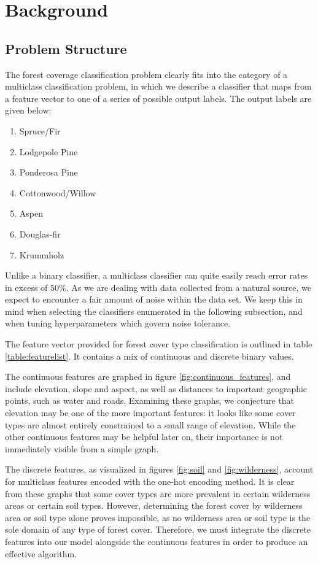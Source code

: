 \section{Background}
\label{sec:-back}
\subsection{Problem Structure}
The forest coverage classification problem clearly fits into the 
category of a multiclass classification problem, in which we describe 
a classifier that maps from a feature vector to one of a series of 
possible output labels. The output labels are given below:

\begin{enumerate}
\item Spruce/Fir
\item Lodgepole Pine
\item Ponderosa Pine
\item Cottonwood/Willow
\item Aspen
\item Douglas-fir
\item Krummholz
\end{enumerate}

Unlike a binary classifier,  a multiclass classifier can quite easily 
reach error rates in excess of 50\%.  As we are dealing with data 
collected from a natural source, we 
expect to encounter a fair amount of noise within the data set.  We keep 
this in mind when selecting the classifiers enumerated in the following 
subsection, and when tuning hyperparameters which govern noise 
tolerance.

The feature vector provided for forest cover type classification is 
outlined in table \ref{table:featurelist}.  It contains a mix of 
continuous and discrete binary values.

The continuous features are graphed in figure \ref{fig:continuous_features},
and include elevation, slope and aspect, as well as distances to important
geographic points, such as water and roads. Examining these graphs, we 
conjecture that elevation may be one of the more important features: it 
looks like some cover types are almost entirely constrained to a 
small range of elevation.  While the other continuous features may be 
helpful later on, their importance is not immediately visible from a 
simple graph.

The discrete features, as visualized in figures \ref{fig:soil} 
and \ref{fig:wilderness}, account for multiclass features encoded with 
the one-hot encoding method. It is clear from these graphs that some 
cover types are more prevalent in certain wilderness areas or certain 
soil types. However, determining the forest cover by wilderness area 
or soil type alone proves impossible, as no wilderness area or soil 
type is the sole domain of any type of forest cover.  Therefore, we must 
integrate the discrete features into our model alongside the continuous 
features in order to produce an effective algorithm.

